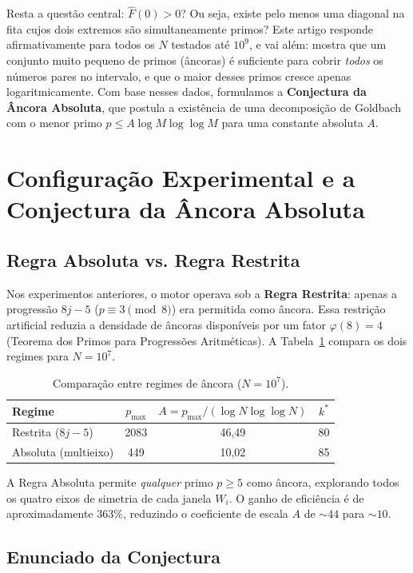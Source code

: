 \documentclass[11pt]{article}
\begin{document}
	Resta a questão central: $\widehat{F}(0) > 0$? Ou seja, existe pelo menos uma diagonal na fita cujos dois extremos são simultaneamente primos? Este artigo responde afirmativamente para todos os $N$ testados até $10^9$, e vai além: mostra que um conjunto muito pequeno de primos (âncoras) é suficiente para cobrir \emph{todos} os números pares no intervalo, e que o maior desses primos cresce apenas logaritmicamente. Com base nesses dados, formulamos a \textbf{Conjectura da Âncora Absoluta}, que postula a existência de uma decomposição de Goldbach com o menor primo $p \le A \log M \log\log M$ para uma constante absoluta $A$.
	
	\section{Configuração Experimental e a Conjectura da Âncora Absoluta}
	
	\subsection{Regra Absoluta vs. Regra Restrita}
	
	Nos experimentos anteriores, o motor operava sob a \textbf{Regra Restrita}: apenas a progressão $8j-5$ ($p \equiv 3 \pmod 8$) era permitida como âncora. Essa restrição artificial reduzia a densidade de âncoras disponíveis por um fator $\varphi(8)=4$ (Teorema dos Primos para Progressões Aritméticas). A Tabela~\ref{tab:regimes} compara os dois regimes para $N=10^7$.
	
	\begin{table}[h]
		\centering
		\caption{Comparação entre regimes de âncora ($N=10^7$).}
		\label{tab:regimes}
		\begin{tabular}{lccc}
			\toprule
			Regime & $p_{\max}$ & $A = p_{\max}/(\log N\log\log N)$ & $k^*$ \\
			\midrule
			Restrita ($8j-5$) & 2083 & 46,49 & 80 \\
			Absoluta (multieixo) & 449 & 10,02 & 85 \\
			\bottomrule
		\end{tabular}
	\end{table}
	
	A Regra Absoluta permite \emph{qualquer} primo $p\ge5$ como âncora, explorando todos os quatro eixos de simetria de cada janela $W_i$. O ganho de eficiência é de aproximadamente $363\%$, reduzindo o coeficiente de escala $A$ de $\sim44$ para $\sim10$.
	
	\subsection{Enunciado da Conjectura}
	
\end{document}
